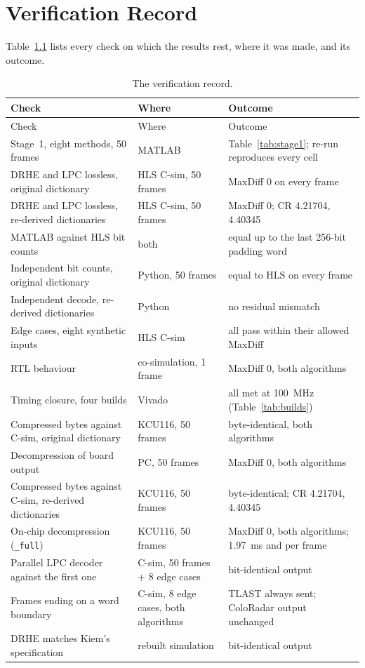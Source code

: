 \chapter{Verification Record}
\label{app:verify}

Table~\ref{tab:verify} lists every check on which the results rest, where it
was made, and its outcome.

\begin{longtable}{@{}p{55mm}p{38mm}p{45mm}@{}}
\caption[Verification record]{The verification record.}\label{tab:verify}\\
\toprule
Check & Where & Outcome\\
\midrule
\endfirsthead
\toprule
Check & Where & Outcome\\
\midrule
\endhead
Stage~1, eight methods, 50 frames & MATLAB & Table~\ref{tab:stage1}; re-run reproduces every cell\\
DRHE and LPC lossless, original dictionary & HLS C-sim, 50 frames & MaxDiff 0 on every frame\\
DRHE and LPC lossless, re-derived dictionaries & HLS C-sim, 50 frames & MaxDiff 0; CR \num{4.21704}, \num{4.40345}\\
MATLAB against HLS bit counts & both & equal up to the last 256-bit padding word\\
Independent bit counts, original dictionary & Python, 50 frames & equal to HLS on every frame\\
Independent decode, re-derived dictionaries & Python & no residual mismatch\\
Edge cases, eight synthetic inputs & HLS C-sim & all pass within their allowed MaxDiff\\
RTL behaviour & co-simulation, 1 frame & MaxDiff 0, both algorithms\\
Timing closure, four builds & Vivado & all met at \SI{100}{\mega\hertz} (Table~\ref{tab:builds})\\
Compressed bytes against C-sim, original dictionary & KCU116, 50 frames & byte-identical, both algorithms\\
Decompression of board output & PC, 50 frames & MaxDiff 0, both algorithms\\
Compressed bytes against C-sim, re-derived dictionaries & KCU116, 50 frames & byte-identical; CR \num{4.21704}, \num{4.40345}\\
On-chip decompression (\texttt{\_full}) & KCU116, 50 frames & MaxDiff 0, both algorithms; \SI{1.97}{\milli\second} and \lpcDecTime{} per frame\\
Parallel LPC decoder against the first one & C-sim, 50 frames + 8 edge cases & bit-identical output\\
Frames ending on a word boundary & C-sim, 8 edge cases, both algorithms & TLAST always sent; ColoRadar output unchanged\\
DRHE matches Kiem's specification & rebuilt simulation & bit-identical output\\
\bottomrule
\end{longtable}
